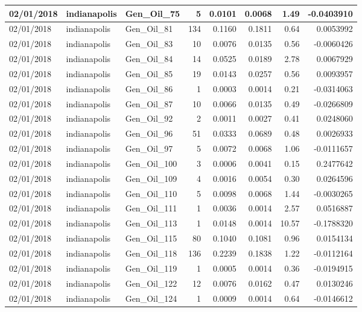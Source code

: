 \documentclass[
  letterpaper,
  DIV=11,
  numbers=noendperiod]{scrartcl}
\begin{document}
\begin{tabular}{l|l|l|r|r|r|r|r}
\hline
02/01/2018 & indianapolis & Gen\_Oil\_75 & 5 & 0.0101 & 0.0068 & 1.49 & -0.0403910\\
\hline
02/01/2018 & indianapolis & Gen\_Oil\_81 & 134 & 0.1160 & 0.1811 & 0.64 & 0.0053992\\
\hline
02/01/2018 & indianapolis & Gen\_Oil\_83 & 10 & 0.0076 & 0.0135 & 0.56 & -0.0060426\\
\hline
02/01/2018 & indianapolis & Gen\_Oil\_84 & 14 & 0.0525 & 0.0189 & 2.78 & 0.0067929\\
\hline
02/01/2018 & indianapolis & Gen\_Oil\_85 & 19 & 0.0143 & 0.0257 & 0.56 & 0.0093957\\
\hline
02/01/2018 & indianapolis & Gen\_Oil\_86 & 1 & 0.0003 & 0.0014 & 0.21 & -0.0314063\\
\hline
02/01/2018 & indianapolis & Gen\_Oil\_87 & 10 & 0.0066 & 0.0135 & 0.49 & -0.0266809\\
\hline
02/01/2018 & indianapolis & Gen\_Oil\_92 & 2 & 0.0011 & 0.0027 & 0.41 & 0.0248060\\
\hline
02/01/2018 & indianapolis & Gen\_Oil\_96 & 51 & 0.0333 & 0.0689 & 0.48 & 0.0026933\\
\hline
02/01/2018 & indianapolis & Gen\_Oil\_97 & 5 & 0.0072 & 0.0068 & 1.06 & -0.0111657\\
\hline
02/01/2018 & indianapolis & Gen\_Oil\_100 & 3 & 0.0006 & 0.0041 & 0.15 & 0.2477642\\
\hline
02/01/2018 & indianapolis & Gen\_Oil\_109 & 4 & 0.0016 & 0.0054 & 0.30 & 0.0264596\\
\hline
02/01/2018 & indianapolis & Gen\_Oil\_110 & 5 & 0.0098 & 0.0068 & 1.44 & -0.0030265\\
\hline
02/01/2018 & indianapolis & Gen\_Oil\_111 & 1 & 0.0036 & 0.0014 & 2.57 & 0.0516887\\
\hline
02/01/2018 & indianapolis & Gen\_Oil\_113 & 1 & 0.0148 & 0.0014 & 10.57 & -0.1788320\\
\hline
02/01/2018 & indianapolis & Gen\_Oil\_115 & 80 & 0.1040 & 0.1081 & 0.96 & 0.0154134\\
\hline
02/01/2018 & indianapolis & Gen\_Oil\_118 & 136 & 0.2239 & 0.1838 & 1.22 & -0.0112164\\
\hline
02/01/2018 & indianapolis & Gen\_Oil\_119 & 1 & 0.0005 & 0.0014 & 0.36 & -0.0194915\\
\hline
02/01/2018 & indianapolis & Gen\_Oil\_122 & 12 & 0.0076 & 0.0162 & 0.47 & 0.0130246\\
\hline
02/01/2018 & indianapolis & Gen\_Oil\_124 & 1 & 0.0009 & 0.0014 & 0.64 & -0.0146612\\

\end{tabular}
\end{document}
